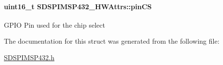 \paragraph[{pin\+C\+S}]{\setlength{\rightskip}{0pt plus 5cm}uint16\+\_\+t S\+D\+S\+P\+I\+M\+S\+P432\+\_\+\+H\+W\+Attrs\+::pin\+C\+S}\label{struct_s_d_s_p_i_m_s_p432___h_w_attrs_aa1728785c98fc4498d8b3e185918293d}
G\+P\+I\+O Pin used for the chip select 

The documentation for this struct was generated from the following file\+:\begin{DoxyCompactItemize}
\item 
\hyperlink{_s_d_s_p_i_m_s_p432_8h}{S\+D\+S\+P\+I\+M\+S\+P432.\+h}\end{DoxyCompactItemize}
